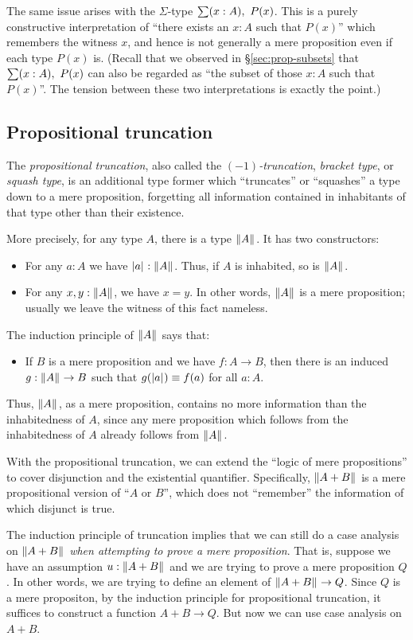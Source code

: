 The same issue arises with the $\Sigma$-type $\sm{x:A} P(x)$.
This is a purely constructive interpretation of ``there exists an $x:A$ such that $P(x)$'' which remembers the witness $x$, and hence is not generally a mere proposition even if each type $P(x)$ is.
(Recall that we observed in \S\ref{sec:prop-subsets} that $\sm{x:A} P(x)$ can also be regarded as ``the subset of those $x:A$ such that $P(x)$''.
The tension between these two interpretations is exactly the point.)


\subsection{Propositional truncation}
\label{subsec:prop-trunc}

The \emph{propositional truncation}, also called the \emph{$(-1)$-truncation}, \emph{bracket type}, or \emph{squash type}, is an additional type former which ``truncates'' or ``squashes'' a type down to a mere proposition, forgetting all information contained in inhabitants of that type other than their existence.

More precisely, for any type $A$, there is a type $\Vert A\Vert_{}$.
It has two constructors:
\begin{itemize}
\item For any $a:A$ we have $|a|_{} : \Vert A\Vert_{}$.
  Thus, if $A$ is inhabited, so is $\Vert A\Vert_{}$.
\item For any $x,y:\Vert A\Vert_{}$, we have $x=y$.
  In other words, $\Vert A\Vert_{}$ is a mere proposition; usually we leave the witness of this fact nameless.
\end{itemize}
The induction principle of $\Vert A\Vert_{}$ says that:
\begin{itemize}
\item If $B$ is a mere proposition and we have $f:A\to B$, then there is an induced $g:\Vert A\Vert_{} \to B$ such that $g(|a|_{}) \equiv f(a)$ for all $a:A$.
\end{itemize}
Thus, $\Vert A\Vert_{}$, as a mere proposition, contains no more information than the inhabitedness of $A$, since any mere proposition which follows from the inhabitedness of $A$ already follows from $\Vert A\Vert_{}$.

With the propositional truncation, we can extend the ``logic of mere propositions'' to cover disjunction and the existential quantifier.
Specifically, $\Vert A+B\Vert_{}$ is a mere propositional version of ``$A$ or $B$'', which does not ``remember'' the information of which disjunct is true.

The induction principle of truncation implies that we can still do a case analysis on $\Vert A+B\Vert_{}$ \emph{when attempting to prove a mere proposition}.
That is, suppose we have an assumption $u:\Vert A+B\Vert_{}$ and we are trying to prove a mere proposition $Q$.
In other words, we are trying to define an element of $\Vert A+B\Vert_{} \to Q$.
Since $Q$ is a mere propositon, by the induction principle for propositional truncation, it suffices to construct a function $A+B\to Q$.
But now we can use case analysis on $A+B$.

